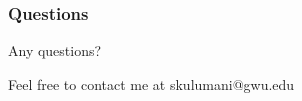 \begin{frame} %
\frametitle{Questions}

Any questions?

Feel free to contact me at skulumani@gwu.edu
\end{frame} %